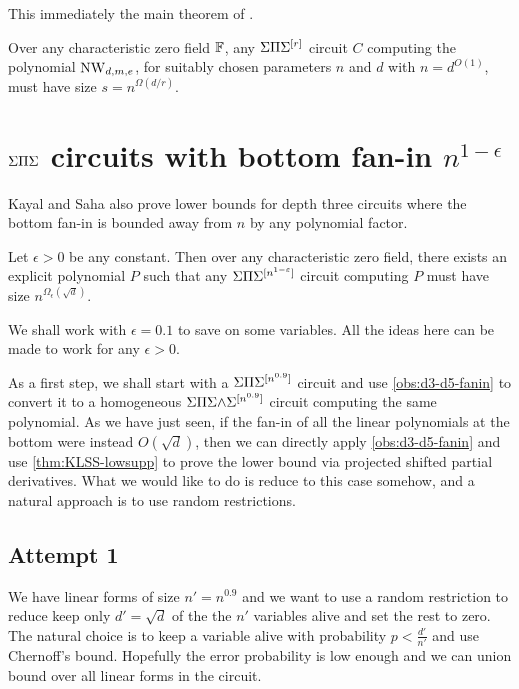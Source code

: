 This immediately  the main theorem of \cite{KayalSaha14}.

\begin{theorem}\label{thm:kaysaha-main}
  Over any characteristic zero field $\mathbb{F}$, any $\Sigma\Pi\Sigma^{[r]}$ circuit
  $C$ computing the polynomial $\operatorname{\mathrm{NW}}_{d,m,e}$, for suitably chosen
  parameters $n$ and $d$ with $n = d^{O(1)}$, must have size $s =
  n^{\Omega(d/r)}$. 
\end{theorem}

\section{$\Sigma\Pi\Sigma$ circuits with bottom fan-in $n^{1-\epsilon}$}

Kayal and Saha \cite{KayalSaha14} also prove lower bounds for depth three circuits
where the bottom fan-in is bounded away from $n$ by any polynomial factor. 

\begin{theorem} Let $\epsilon > 0$ be any
  constant.
Then over any characteristic zero field, there exists an explicit polynomial $P$ such that any $\Sigma\Pi\Sigma^{[n^{1 - \varepsilon}]}$ circuit computing $P$ must have size $n^{\Omega_\epsilon(\sqrt{d})}$.
\end{theorem}

We shall work with $\epsilon = 0.1$ to save on some variables. All the ideas here can be made to work for any $\epsilon > 0$. 

As a first step, we shall start with a $\Sigma\Pi\Sigma^{[n^{0.9}]}$ circuit and use \autoref{obs:d3-d5-fanin} to convert it to a homogeneous $\Sigma\Pi\Sigma\mathord{\wedge}\Sigma^{[n^{0.9}]}$ circuit computing the same polynomial.
As we have just seen, if the fan-in of all the linear polynomials at the bottom were instead $O(\sqrt{d})$, then we can directly apply \autoref{obs:d3-d5-fanin} and use \autoref{thm:KLSS-lowsupp} to prove the lower bound via projected shifted partial derivatives.
What we would like to do is reduce to this case somehow, and a natural approach is to use random restrictions.

\subsection*{Attempt 1}

We have linear forms of size $n' = n^{0.9}$ and we want to use a random restriction to reduce keep only $d' = \sqrt{d}$ of the the $n'$ variables alive and set the rest to zero.
The natural choice is to keep a variable alive with probability $p < \frac{d'}{n'}$ and use Chernoff's bound. Hopefully the error probability is low enough and we can union bound over all linear forms in the circuit. 

